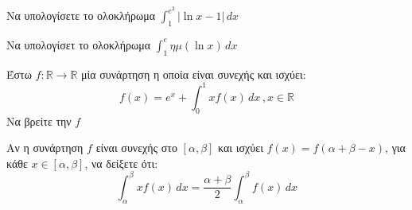 \documentclass{presentation}
\begin{document}
\begin{askisi}
    Να υπολογίσετε το ολοκλήρωμα $\int_{1}^{e^2} |\ln x-1| \,dx$

\end{askisi}

\begin{askisi}
    Να υπολογίσετ το ολοκλήρωμα $\int_{1}^{e} ημ(\ln x) \,dx$

\end{askisi}

\begin{askisi}
    Έστω $f:\mathbb{R}\to\mathbb{R}$ μία συνάρτηση η οποία είναι συνεχής και ισχύει:
    $$f(x)=e^x+\int_{0}^{1} xf(x) \,dx\, , x\in\mathbb{R}$$
    Να βρείτε την $f$

\end{askisi}

\begin{askisi}
    Αν η συνάρτηση $f$ είναι συνεχής στο $[α,β]$ και ισχύει $f(x)=f(α+β-x)$, για κάθε $x\in [α,β]$, να δείξετε ότι:
    $$\int_{α}^{β} xf(x) \,dx=\dfrac{α+β}{2}\int_{α}^{β} f(x) \,dx$$

\end{askisi}


%
%
%
%
%
%
\end{document}
